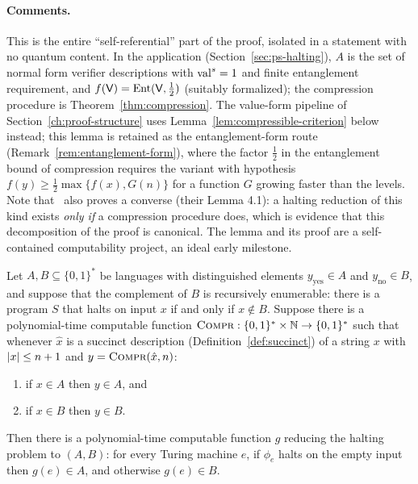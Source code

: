 \paragraph{Comments.} This is the entire ``self-referential'' part of the proof,
isolated in a statement with no quantum content. In the application
(Section~\ref{sec:ps-halting}), $A$ is the set of normal form verifier descriptions
with $\mathrm{val}^{s} = 1$ and finite entanglement requirement, and $f(\mathsf{V}) =
\mathrm{Ent}(\mathsf{V}, \frac12)$ (suitably formalized); the compression procedure is
Theorem~\ref{thm:compression}. The value-form pipeline of
Section~\ref{ch:proof-structure} uses Lemma~\ref{lem:compressible-criterion} below
instead; this lemma is retained as the entanglement-form route
(Remark~\ref{rem:entanglement-form}), where the factor $\frac12$ in the entanglement
bound of compression requires the variant with hypothesis $f(y) \geq \frac12
\max\{f(x), G(n)\}$ for a function $G$ growing faster than the levels. Note that~\cite{MNY} also proves a converse (their
Lemma 4.1): a halting reduction of this kind exists \emph{only if} a compression
procedure does, which is evidence that this decomposition of the proof is canonical.
The lemma and its proof are a self-contained computability project, an ideal early
milestone.

\begin{lemma}
\label{lem:compressible-criterion}
\leanok
Let $A, B \subseteq \{0,1\}^*$ be languages with distinguished elements
$y_{\mathrm{yes}} \in A$ and $y_{\mathrm{no}} \in B$, and suppose that the complement of
$B$ is recursively enumerable: there is a program $S$ that halts on input $x$ if and only
if $x \notin B$. Suppose there is a polynomial-time computable function $\textsc{Compr} : \{0,1\}^*
\times \mathbb{N} \to \{0,1\}^*$ such that whenever $\hat{x}$ is a succinct description
(Definition~\ref{def:succinct}) of a string $x$ with $\left\vert {x} \right\vert \leq n + 1$ and
$y = \textsc{Compr}(\hat{x}, n)$:
\begin{enumerate}
\item if $x \in A$ then $y \in A$, and
\item if $x \in B$ then $y \in B$.
\end{enumerate}
Then there is a polynomial-time computable function $g$ reducing the halting problem to
$(A, B)$: for every Turing machine $e$, if $\phi_e$ halts on the empty input then $g(e)
\in A$, and otherwise $g(e) \in B$.
\end{lemma}

